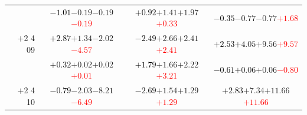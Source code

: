 \documentclass[compress]{beamer}
\begin{document}
\begin{frame}
\begin{tabular}{r | c | c | c}
          & \textcolor{black}{$-1.01$}\hspace{0.1 cm}$-0.19$\hspace{0.1 cm}$-0.19$\hspace{0.1 cm}\textcolor{red}{$-0.19$} & \textcolor{black}{$+0.92$}\hspace{0.1 cm}$+1.41$\hspace{0.1 cm}$+1.97$\hspace{0.1 cm}\textcolor{red}{$+0.33$} & \textcolor{black}{$-0.35$}\hspace{0.1 cm}$-0.77$\hspace{0.1 cm}$-0.77$\hspace{0.1 cm}\textcolor{red}{$+1.68$} \\
$+$2 4 09 & \textcolor{black}{$+2.87$}\hspace{0.1 cm}$+1.34$\hspace{0.1 cm}$-2.02$\hspace{0.1 cm}\textcolor{red}{$-4.57$} & \textcolor{black}{$-2.49$}\hspace{0.1 cm}$+2.66$\hspace{0.1 cm}$+2.41$\hspace{0.1 cm}\textcolor{red}{$+2.41$} & \textcolor{black}{$+2.53$}\hspace{0.1 cm}$+4.05$\hspace{0.1 cm}$+9.56$\hspace{0.1 cm}\textcolor{red}{$+9.57$} \\
          & \textcolor{black}{$+0.32$}\hspace{0.1 cm}$+0.02$\hspace{0.1 cm}$+0.02$\hspace{0.1 cm}\textcolor{red}{$+0.01$} & \textcolor{black}{$+1.79$}\hspace{0.1 cm}$+1.66$\hspace{0.1 cm}$+2.22$\hspace{0.1 cm}\textcolor{red}{$+3.21$} & \textcolor{black}{$-0.61$}\hspace{0.1 cm}$+0.06$\hspace{0.1 cm}$+0.06$\hspace{0.1 cm}\textcolor{red}{$-0.80$} \\
$+$2 4 10 & \textcolor{black}{$-0.79$}\hspace{0.1 cm}$-2.03$\hspace{0.1 cm}$-8.21$\hspace{0.1 cm}\textcolor{red}{$-6.49$} & \textcolor{black}{$-2.69$}\hspace{0.1 cm}$+1.54$\hspace{0.1 cm}$+1.29$\hspace{0.1 cm}\textcolor{red}{$+1.29$} & \textcolor{black}{$+2.83$}\hspace{0.1 cm}$+7.34$\hspace{0.1 cm}$+11.66$\hspace{0.1 cm}\textcolor{red}{$+11.66$} \\

\end{tabular}
\end{frame}
\end{document}
